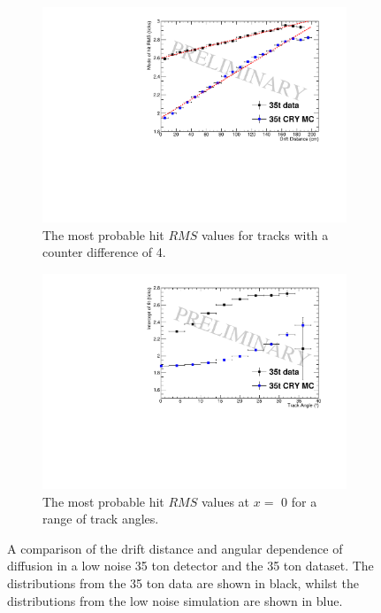 \begin{figure}[h!]
  \centering
  \begin{subfigure}{0.45\textwidth}
    \centering
    \includegraphics[width=\textwidth]{CounterDiff4_Overlay}
    \caption{The most probable hit $RMS$ values for tracks with a counter difference of 4.}
    \label{fig:DiffMCDataCompFit}
  \end{subfigure}
  \hspace{0.08\textwidth}
  \begin{subfigure}{0.45\textwidth}
    \centering
    \includegraphics[width=\textwidth]{InterceptCanvasOverlay}
    \caption{The most probable hit $RMS$ values at $x = $ 0 for a range of track angles.}
    \label{fig:DiffMCDataCompInt}
  \end{subfigure}
  \caption[Comparison of the drift distance and angular dependence of diffusion in a low noise 35 ton detector and the 35 ton dataset]
          {A comparison of the drift distance and angular dependence of diffusion in a low noise 35 ton detector and the 35 ton dataset. The distributions from the 35 ton data are shown in black, whilst the distributions from the low noise simulation are shown in blue.}
          \label{fig:DiffMCDataComp}
\end{figure}

